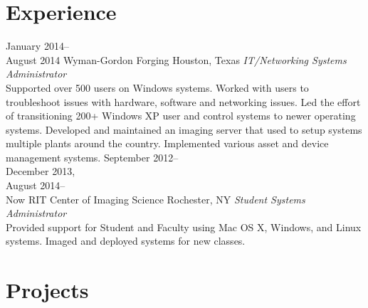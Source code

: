 \documentclass[]{CalebCoffie-CV-Class} %
\begin{document}

\section{Experience}

\begin{entrylist}
\entry
{January 2014--\\August 2014}
{Wyman-Gordon Forging}
{Houston, Texas}
{\emph{IT/Networking Systems Administrator} \\
Supported over 500 users on Windows systems. Worked with users to troubleshoot issues with hardware, software and networking issues. Led the effort of transitioning 200+ Windows XP user and control systems to newer operating systems. Developed and maintained an imaging server that used to setup systems multiple plants around the country. Implemented various asset and device management systems.}
\entry
{September 2012--\\December 2013,\\August 2014--\\Now}
{RIT Center of Imaging Science}
{Rochester, NY}
{\emph{Student Systems Administrator} \\
Provided support for Student and Faculty using Mac OS X, Windows, and Linux systems. Imaged and deployed systems for new classes.}
\end{entrylist}


\section{Projects}
\end{document}
